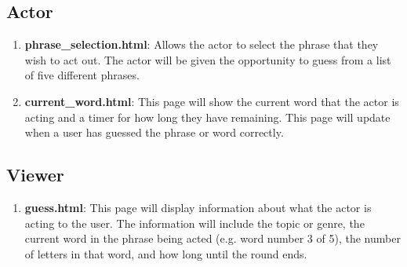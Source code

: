 \documentclass{article}
\begin{document}
\subsection{Actor}

\begin{enumerate}
	\item \textbf{phrase\_selection.html}: Allows the actor to select the phrase that they wish to act out. The actor will be given the opportunity to guess from a list of five different phrases.
	
	\item \textbf{current\_word.html}: This page will show the current word that the actor is acting and a timer for how long they have remaining. This page will update when a user has guessed the phrase or word correctly. 
	
\end{enumerate}


\subsection{Viewer}

\begin{enumerate}
	\item \textbf{guess.html}: This page will display information about what the actor is acting to the user. The information will include the topic or genre, the current word in the phrase being acted (e.g. word number 3 of 5), the number of letters in that word, and how long until the round ends.
	
\end{enumerate}
 
\end{document}
